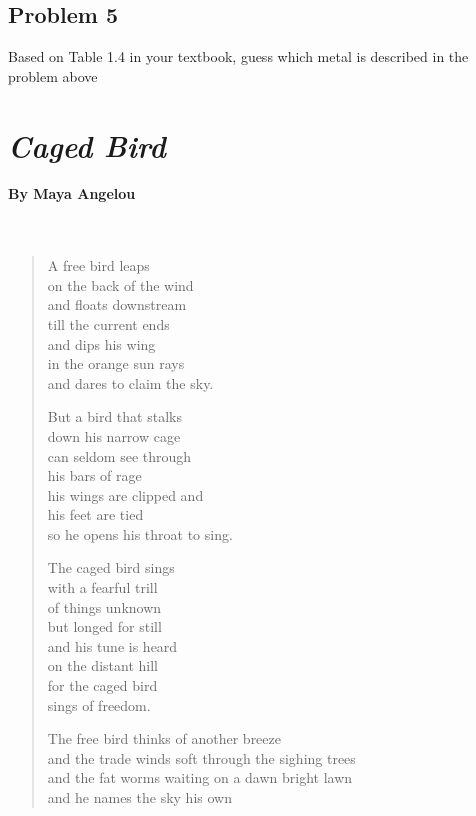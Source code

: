\documentclass[11pt, letterpaper]{memoir}
\begin{document}
{\vspace{3em}
\subsection*{Problem 5}
Based on Table 1.4 in your textbook, guess which metal is described in the problem above

\newpage
\pagestyle{empty}
\addtocounter{page}{-1}
\section*{\emph{Caged Bird}}
\paragraph{By Maya Angelou}~
\begin{verse}
	A free bird leaps\\
	on the back of the wind\\
	and floats downstream\\
	till the current ends\\
	and dips his wing\\
	in the orange sun rays\\
	and dares to claim the sky.

	But a bird that stalks\\
	down his narrow cage\\
	can seldom see through\\
	his bars of rage\\
	his wings are clipped and\\
	his feet are tied\\
	so he opens his throat to sing.

	The caged bird sings\\
	with a fearful trill\\
	of things unknown\\
	but longed for still\\
	and his tune is heard\\
	on the distant hill\\
	for the caged bird\\
	sings of freedom.

	The free bird thinks of another breeze\\
	and the trade winds soft through the sighing trees\\
	and the fat worms waiting on a dawn bright lawn\\
	and he names the sky his own


\end{verse}}
\end{document}
